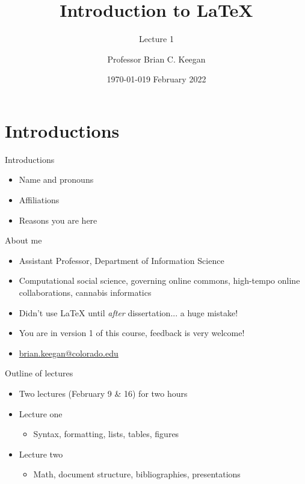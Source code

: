 \documentclass{cubeamer}
\title{Introduction to \LaTeX}
\subtitle{%
Lecture 1
}
\author[Brian Keegan]{Professor Brian C. Keegan}
\date{\today} %
\institute[Information Science]{Department of Information Science}
\date{9 February 2022}
\begin{document}
\maketitle


\section{Introductions}


\begin{frame}{Introductions}
    \begin{itemize}
        \item Name and pronouns
        \item Affiliations
        \item Reasons you are here
    \end{itemize}
\end{frame}

\begin{frame}{About me}
    \begin{itemize}
        \item Assistant Professor, Department of Information Science
        \item Computational social science, governing online commons, high-tempo online collaborations, cannabis informatics
        \item Didn't use \LaTeX{} until \textit{after} dissertation... a huge mistake!
        \item You are in version 1 of this course, feedback is very welcome!
        \item \href{mailto:brian.keegan@colorado.edu}{brian.keegan@colorado.edu}
    \end{itemize}
\end{frame}


\begin{frame}{Outline of lectures}
    \begin{itemize}
        \item Two lectures (February 9 \& 16) for two hours
        \item Lecture one
        \begin{itemize}
            \item Syntax, formatting, lists, tables, figures
        \end{itemize}
        \item Lecture two
        \begin{itemize}
            \item Math, document structure, bibliographies, presentations
        \end{itemize}
    \end{itemize}
\end{frame}
\end{document}

